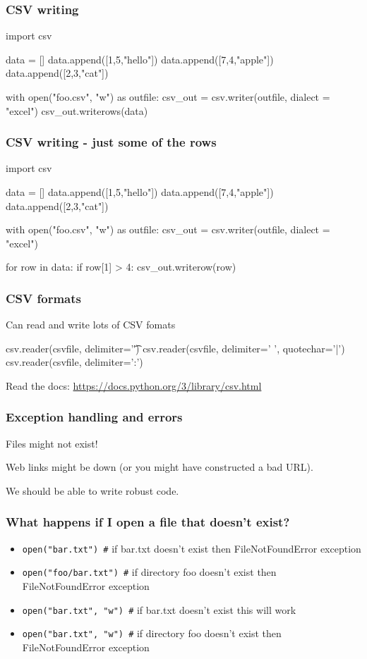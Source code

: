 \documentclass{beamer}
\begin{document}
\begin{frame}[fragile]
\frametitle{CSV writing}
\begin{code}
import csv

data = []
data.append([1,5,"hello"])
data.append([7,4,"apple"])
data.append([2,3,"cat"])

with open("foo.csv", "w") as outfile:
   csv_out = csv.writer(outfile, dialect = "excel")
   csv_out.writerows(data)
\end{code}
\end{frame}

\begin{frame}[fragile]
\frametitle{CSV writing - just some of the rows}
\begin{code}
import csv

data = []
data.append([1,5,"hello"])
data.append([7,4,"apple"])
data.append([2,3,"cat"])

with open("foo.csv", "w") as outfile:
   csv_out = csv.writer(outfile, dialect = "excel")

   for row in data:
      if row[1] > 4:
          csv_out.writerow(row)
\end{code}
\end{frame}

\begin{frame}[fragile]
\frametitle{CSV formats}
Can read and write lots of CSV fomats
\begin{code}
csv.reader(csvfile, delimiter='\t')
csv.reader(csvfile, delimiter=' ', quotechar='|')
csv.reader(csvfile, delimiter=':')
\end{code}

Read the docs:
\url{https://docs.python.org/3/library/csv.html}
\end{frame}


\begin{frame}[fragile]
\frametitle{Exception handling and errors}
Files might not exist!

Web links might be down (or you might have constructed a bad URL).

We should be able to write robust code.
\end{frame}

\begin{frame}[fragile]
\frametitle{What happens if I open a file that doesn't exist?}
\begin{itemize}
\item \lstinline{open("bar.txt") #} if bar.txt doesn't exist then FileNotFoundError exception
\item \lstinline{open("foo/bar.txt") #} if directory foo doesn't exist then FileNotFoundError exception
\item \lstinline{open("bar.txt", "w") #} if bar.txt doesn't exist this will work
\item \lstinline{open("bar.txt", "w") #} if directory foo doesn't exist then FileNotFoundError exception
\end{itemize}
\end{frame}
\end{document}
